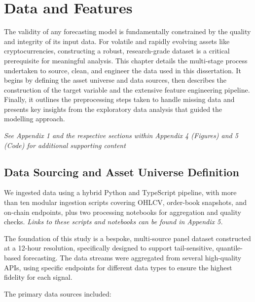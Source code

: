 \documentclass[
  a4paper,
  DIV=11,
  numbers=noendperiod]{scrreprt}
\begin{document}

\chapter{Data and Features}\label{data-and-features}

The validity of any forecasting model is fundamentally constrained by
the quality and integrity of its input data. For volatile and rapidly
evolving assets like cryptocurrencies, constructing a robust,
research-grade dataset is a critical prerequisite for meaningful
analysis. This chapter details the multi-stage process undertaken to
source, clean, and engineer the data used in this dissertation. It
begins by defining the asset universe and data sources, then describes
the construction of the target variable and the extensive feature
engineering pipeline. Finally, it outlines the preprocessing steps taken
to handle missing data and presents key insights from the exploratory
data analysis that guided the modelling approach.

\emph{See Appendix 1 and the respective sections within Appendix 4
(Figures) and 5 (Code) for additional supporting content}

\section{Data Sourcing and Asset Universe
Definition}\label{data-sourcing-and-asset-universe-definition}

We ingested data using a hybrid Python and TypeScript pipeline, with
more than ten modular ingestion scripts covering OHLCV, order-book
snapshots, and on-chain endpoints, plus two processing notebooks for
aggregation and quality checks. \emph{Links to these scripts and
notebooks can be found in Appendix 5.}

The foundation of this study is a bespoke, multi-source panel dataset
constructed at a 12-hour resolution, specifically designed to support
tail-sensitive, quantile-based forecasting. The data streams were
aggregated from several high-quality APIs, using specific endpoints for
different data types to ensure the highest fidelity for each signal.

The primary data sources included:
\end{document}
